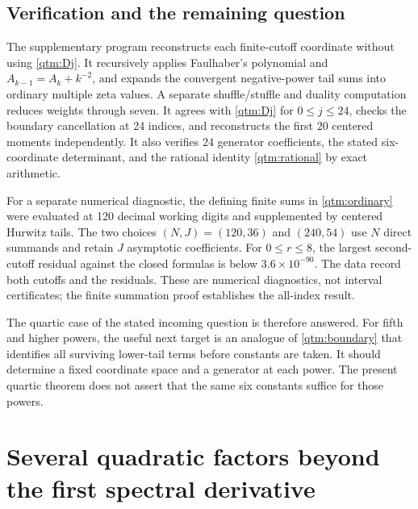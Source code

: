 \documentclass[11pt,a4paper]{article}
\numberwithin{equation}{section}
\theoremstyle{plain}
\theoremstyle{definition}
\theoremstyle{remark}
\begin{document}
\subsection{Verification and the remaining question}

The supplementary program reconstructs each finite-cutoff coordinate
without using \eqref{qtm:Dj}.  It recursively applies Faulhaber's
polynomial and $A_{k-1}=A_k+k^{-2}$, and expands the convergent
negative-power tail sums into ordinary multiple zeta values.  A separate
shuffle/stuffle and duality computation reduces weights through seven.
It agrees with \eqref{qtm:Dj} for $0\le j\le24$, checks the
boundary cancellation at 24 indices, and reconstructs the first 20
centered moments independently.  It also verifies 24 generator
coefficients, the stated six-coordinate determinant, and the rational
identity \eqref{qtm:rational} by exact arithmetic.

For a separate numerical diagnostic, the defining finite sums in
\eqref{qtm:ordinary} were evaluated at 120 decimal working digits and
supplemented by centered Hurwitz tails.  The two choices
$(N,J)=(120,36)$ and $(240,54)$ use $N$ direct summands and retain
$J$ asymptotic coefficients.  For $0\le r\le8$, the largest
second-cutoff residual against the closed formulas is below
$3.6\times10^{-90}$.  The data record both cutoffs and the residuals.
These are numerical diagnostics, not interval certificates; the finite
summation proof establishes the all-index result.

The quartic case of the stated incoming question is therefore answered.
For fifth and higher powers, the useful next target is an analogue of
\eqref{qtm:boundary} that identifies all surviving lower-tail terms
before constants are taken.  It should determine a fixed coordinate
space and a generator at each power.  The present quartic theorem
does not assert that the same six constants suffice for those powers.




\section{Several quadratic factors beyond the first spectral derivative}
\label{msj:sec:main}
\end{document}

